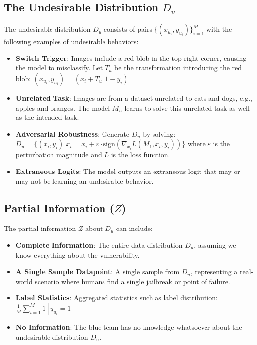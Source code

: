 \documentclass[letterpaper]{article} %
\begin{document}
\subsection{The Undesirable Distribution $D_u$}

The undesirable distribution $D_u$ consists of pairs $\{(x_{u_i}, y_{u_i})\}_{i=1}^{M}$ with the following examples of undesirable behaviors:

\begin{itemize}
    \item \textbf{Switch Trigger}: Images include a red blob in the top-right corner, causing the model to misclassify. Let $T_u$ be the transformation introducing the red blob: $(x_{u_i}, y_{u_i}) = (x_i + T_u, 1 - y_i)$
    \item \textbf{Unrelated Task}: Images are from a dataset unrelated to cats and dogs, e.g., apples and oranges. The model $M_u$ learns to solve this unrelated task as well as the intended task.
    \item \textbf{Adversarial Robustness}: Generate $D_u$ by solving:
    $D_u = \{(x_i, y_i) | x_i = x_i + \varepsilon \cdot \text{sign}(\nabla_{x_i} L(M_1, x_i, y_i))\}$
    where $\varepsilon$ is the perturbation magnitude and $L$ is the loss function.
    \item \textbf{Extraneous Logits}: The model outputs an extraneous logit that may or may not be learning an undesirable behavior.
\end{itemize}

\subsection{Partial Information ($Z$)}

The partial information $Z$ about $D_u$ can include:

\begin{itemize}
    \item \textbf{Complete Information}: The entire data distribution $D_u$, assuming we know everything about the vulnerability.
    \item \textbf{A Single Sample Datapoint}: A single sample from $D_u$, representing a real-world scenario where humans find a single jailbreak or point of failure.
    \item \textbf{Label Statistics}: Aggregated statistics such as label distribution: $\frac{1}{M} \sum_{i=1}^{M} 1[y_{u_i} = 1]$
    \item \textbf{No Information}: The blue team has no knowledge whatsoever about the undesirable distribution $D_u$.
\end{itemize}
\end{document}
